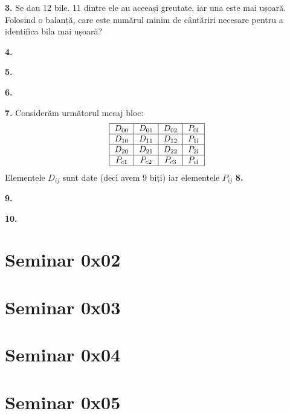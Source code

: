 \documentclass[a4paper]{article}
\newenvironment{definition}[1]
    {\begin{definitionbox}[frametitle={#1}]}
    {\end{definitionbox}}
\begin{document}
\textbf{3.} Se dau 12 bile. 11 dintre ele au aceeași greutate, iar una este mai ușoară. Folosind o balanță, care este numărul minim de cântăriri necesare pentru a identifica bila mai ușoară?


\textbf{4.}


\textbf{5.}


\textbf{6.}


\textbf{7.} Considerăm următorul mesaj bloc:
\[
\begin{tabular}{|c|c|c|c|}
\hline
$D_{00}$ & $D_{01}$ & $D_{02}$ & $P_{0l}$ \\
\hline
$D_{10}$ & $D_{11}$ & $D_{12}$ & $P_{1l}$ \\
\hline
$D_{20}$ & $D_{21}$ & $D_{22}$ & $P_{2l}$ \\
\hline
$P_{c1}$ & $P_{c2}$ & $P_{c3}$ & $P_{cl}$ \\
\hline
\end{tabular}
\]
Elementele $D_{ij}$ sunt date (deci avem 9 biți) iar elementele $P_{ij}$
\textbf{8.}


\textbf{9.}


\textbf{10.}
%

\section{Seminar 0x02}
\section{Seminar 0x03}
\section{Seminar 0x04}
\section{Seminar 0x05}



\end{document}
